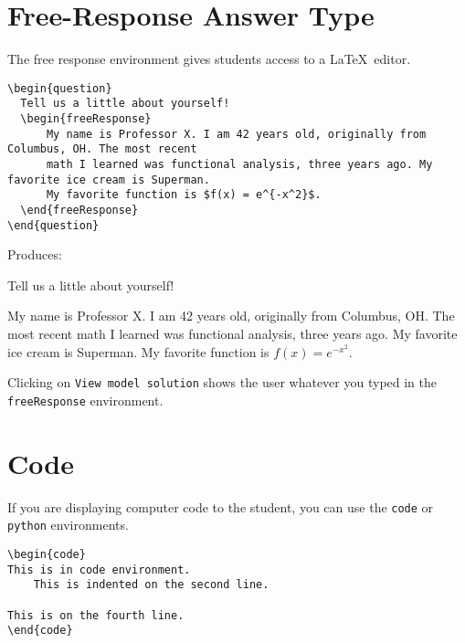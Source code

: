 \documentclass{ximera}
\begin{document}
\section{Free-Response Answer Type} \label{FRAnswerType}

\begin{example}The free response environment gives students access to a \LaTeX\ editor. 

\begin{verbatim}
\begin{question}
  Tell us a little about yourself!
  \begin{freeResponse}
      My name is Professor X. I am 42 years old, originally from Columbus, OH. The most recent 
      math I learned was functional analysis, three years ago. My favorite ice cream is Superman. 
      My favorite function is $f(x) = e^{-x^2}$.
  \end{freeResponse}
\end{question}
\end{verbatim}

Produces:

\begin{question}
  Tell us a little about yourself!
  \begin{freeResponse}
      My name is Professor X. I am 42 years old, originally from Columbus, OH. The most recent 
      math I learned was functional analysis, three years ago. My favorite ice cream is Superman. 
      My favorite function is $f(x) = e^{-x^2}.$
  \end{freeResponse}
\end{question}

\begin{remark}
Clicking on \verb!View model solution! shows the user
whatever you typed in the  \verb!freeResponse! environment.
\end{remark}
\end{example}

\section{Code} \label{CodeAnswers}

If you are displaying computer code to the student, you can use the \verb!code! or \verb!python! environments.

\begin{verbatim}
\begin{code}
This is in code environment.
    This is indented on the second line.

This is on the fourth line.
\end{code}
\end{verbatim}
\end{document}
